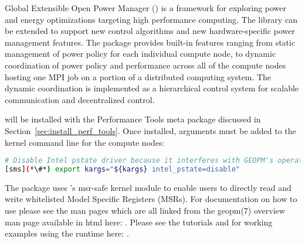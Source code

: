 Global Extensible Open Power Manager (\GEOPM{}) is a framework for exploring
power and energy optimizations targeting high performance computing.  The
library can be extended to support new control algorithms and new
hardware-specific power management features.  The \GEOPM{} package provides
built-in features ranging from static management of power policy for each
individual compute node, to dynamic coordination of power policy and
performance across all of the compute nodes hosting one MPI job on a portion of
a distributed computing system.  The dynamic coordination is implemented as a
hierarchical control system for scalable communication and decentralized
control.

\GEOPM{} will be installed with the Performance Tools meta package
discussed in Section~\ref{sec:install_perf_tools}.  Once installed, arguments
must be added to the kernel command line for the compute nodes:

\begin{lstlisting}[language=bash,keywords={},upquote=true]
# Disable Intel pstate driver because it interferes with GEOPM's operation.
[sms](*\#*) export kargs="${kargs} intel_pstate=disable"
\end{lstlisting}

\noindent The \GEOPM{} package uses \OHPC{}'s msr-safe kernel module
to enable users to directly read and write whitelisted Model Specific
Registers (MSRs).  For documentation on how to use \GEOPM{} please see
the \GEOPM{} man pages which are all linked from the geopm(7) overview
man page available in html here:
\href{http://geopm.github.io/man/geopm.7.html}
{\color{blue}{http://geopm.github.io/man/geopm.7.html}}.
Please see the \GEOPM{} tutorials and for working examples using the
\GEOPM{} runtime here: \href{https://github.com/geopm/geopm/tree/dev/tutorial}
{\color{blue}{https://github.com/geopm/geopm/tree/dev/tutorial}}.
